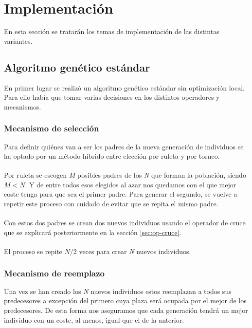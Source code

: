 \section{Implementación}

En esta sección se tratarán los temas de implementación de las distintas variantes.

\subsection{Algoritmo genético estándar}

En primer lugar se realizó un algoritmo genético estándar sin optimización local. Para ello había que tomar varias decisiones en los distintos operadores y mecanismos.

\label{sec:op-seleccion}
\subsubsection{Mecanismo de selección}

Para definir quiénes van a ser los padres de la nueva generación de individuos se ha optado por un método híbrido entre elección por ruleta y por torneo. 
\\ \\
Por ruleta se escogen \textit{M} posibles padres de los \textit{N} que forman la población, siendo $ M < N $. Y de entre todos esos elegidos al azar nos quedamos con el que mejor coste tenga para que sea el primer padre. Para generar el segundo, se vuelve a repetir este proceso con cuidado de evitar que se repita el mismo padre.
\\ \\
Con estos dos padres se crean dos nuevos individuos usando el operador de cruce que se explicará posteriormente en la sección \ref{sec:op-cruce}.
\\ \\
El proceso se repite $ N / 2 $ veces para crear \textit{N} nuevos individuos.

\subsubsection{Mecanismo de reemplazo}

Una vez se han creado los \textit{N} nuevos individuos estos reemplazan a todos sus predecesores a excepción del primero cuya plaza será ocupada por el mejor de los predecesores. De esta forma nos aseguramos que cada generación tendrá un mejor individuo con un coste, al menos, igual que el de la anterior.

